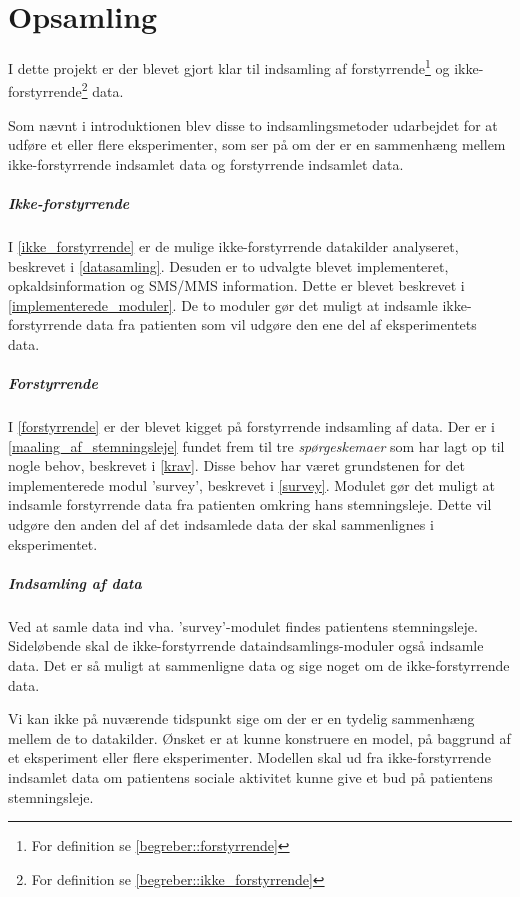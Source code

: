 \chapter{Opsamling}
I dette projekt er der blevet gjort klar til indsamling af forstyrrende\footnote{For definition se \cref{begreber::forstyrrende}} og ikke-forstyrrende\footnote{For definition se \cref{begreber::ikke_forstyrrende}} data. 

Som nævnt i introduktionen blev disse to indsamlingsmetoder udarbejdet for at udføre et eller flere eksperimenter, som ser på om der er en sammenhæng mellem ikke-forstyrrende indsamlet data og forstyrrende indsamlet data.

\paragraph{Ikke-forstyrrende}
I \cref{ikke_forstyrrende} er de mulige ikke-forstyrrende datakilder analyseret, beskrevet i \cref{datasamling}.
Desuden er to udvalgte blevet implementeret, opkaldsinformation og SMS/MMS information.
Dette er blevet beskrevet i \cref{implementerede_moduler}.
De to moduler gør det muligt at indsamle ikke-forstyrrende data fra patienten som vil udgøre den ene del af eksperimentets data.

\paragraph{Forstyrrende}
I \cref{forstyrrende} er der blevet kigget på forstyrrende indsamling af data.
Der er i \cref{maaling_af_stemningsleje} fundet frem til tre \textit{spørgeskemaer} som har lagt op til nogle behov, beskrevet i \cref{krav}.
Disse behov har været grundstenen for det implementerede modul 'survey', beskrevet i \cref{survey}.
Modulet gør det muligt at indsamle forstyrrende data fra patienten omkring hans stemningsleje.
Dette vil udgøre den anden del af det indsamlede data der skal sammenlignes i eksperimentet.

\paragraph{Indsamling af data}
Ved at samle data ind vha. 'survey'-modulet findes patientens stemningsleje.
Sideløbende skal de ikke-forstyrrende dataindsamlings-moduler også indsamle data.
Det er så muligt at sammenligne data og sige noget om de ikke-forstyrrende data.

Vi kan ikke på nuværende tidspunkt sige om der er en tydelig sammenhæng mellem de to datakilder. 
Ønsket er at kunne konstruere en model, på baggrund af et eksperiment eller flere eksperimenter.
Modellen skal ud fra ikke-forstyrrende indsamlet data om patientens sociale aktivitet kunne give et bud på patientens stemningsleje.
